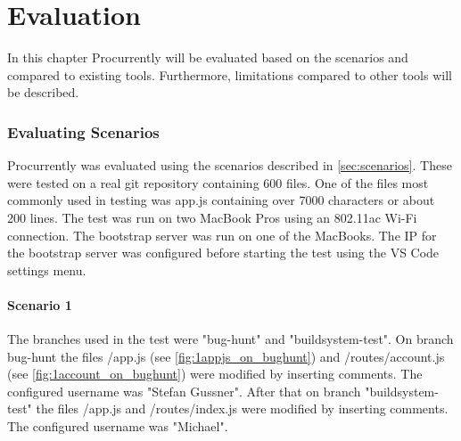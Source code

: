 \chapter{Evaluation}
\label{sec:results}

In this chapter Procurrently will be evaluated based on the scenarios and compared to existing tools.
Furthermore, limitations compared to other tools will be described.

\subsection{Evaluating Scenarios}

Procurrently was evaluated using the scenarios described in \autoref{sec:scenarios}.
These were tested on a real git repository containing 600 files. One of the files most commonly used in testing was app.js containing over 7000 characters or about 200 lines. The test was run on two MacBook Pros using an 802.11ac Wi-Fi connection.
The bootstrap server was run on one of the MacBooks. The IP for the bootstrap server was configured before starting the test using the VS Code settings menu. 

\subsubsection{Scenario 1}

The branches used in the test were "bug-hunt" and "buildsystem-test". On branch bug-hunt the files /app.js (see \autoref{fig:1appjs_on_bughunt}) and /routes/account.js (see \autoref{fig:1account_on_bughunt}) were modified by inserting comments. The configured username was "Stefan Gussner". 
After that on branch "buildsystem-test" the files /app.js and /routes/index.js were modified by inserting comments. The configured username was "Michael".

